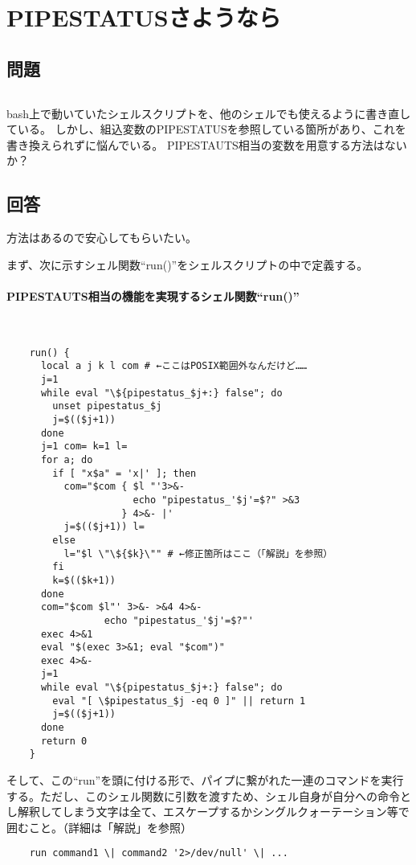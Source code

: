 \section{PIPESTATUSさようなら}
\label{recipe:Sayonara_PIPESTATUS}

\subsection*{問題}
\noindent
$\!\!\!\!\!$
\begin{grshfboxit}{160.0mm}
	bash上で動いていたシェルスクリプトを、他のシェルでも使えるように書き直している。
	しかし、組込変数のPIPESTATUSを参照している箇所があり、これを書き換えられずに悩んでいる。
	PIPESTAUTS相当の変数を用意する方法はないか？
\end{grshfboxit}

\subsection*{回答}
方法はあるので安心してもらいたい。

まず、次に示すシェル関数``run()''をシェルスクリプトの中で定義する。

\paragraph{PIPESTAUTS相当の機能を実現するシェル関数``run()''} 　\\
\begin{frameboxit}{160.0mm}
\begin{verbatim}
	run() {
	  local a j k l com # ←ここはPOSIX範囲外なんだけど……
	  j=1
	  while eval "\${pipestatus_$j+:} false"; do
	    unset pipestatus_$j
	    j=$(($j+1))
	  done
	  j=1 com= k=1 l=
	  for a; do
	    if [ "x$a" = 'x|' ]; then
	      com="$com { $l "'3>&-
	                  echo "pipestatus_'$j'=$?" >&3
	                } 4>&- |'
	      j=$(($j+1)) l=
	    else
	      l="$l \"\${$k}\"" # ←修正箇所はここ（「解説」を参照）
	    fi
	    k=$(($k+1))
	  done
	  com="$com $l"' 3>&- >&4 4>&-
	             echo "pipestatus_'$j'=$?"'
	  exec 4>&1
	  eval "$(exec 3>&1; eval "$com")"
	  exec 4>&-
	  j=1
	  while eval "\${pipestatus_$j+:} false"; do
	    eval "[ \$pipestatus_$j -eq 0 ]" || return 1
	    j=$(($j+1))
	  done
	  return 0
	}
\end{verbatim}
\end{frameboxit}

そして、この``run''を頭に付ける形で、パイプに繋がれた一連のコマンドを実行する。ただし、このシェル関数に引数を渡すため、シェル自身が自分への命令とし解釈してしまう文字は全て、エスケープするかシングルクォーテーション等で囲むこと。（詳細は「解説」を参照）\\
\begin{frameboxit}{160.0mm}
\begin{verbatim}
	run command1 \| command2 '2>/dev/null' \| ...
\end{verbatim}
\end{frameboxit}

